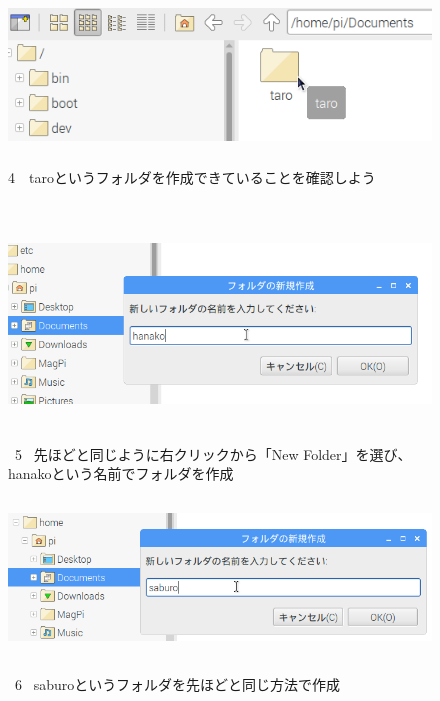 \documentclass[a4paper,12pt]{jarticle}
\begin{document}
\begin{figure}[ht]
  \centering
  \includegraphics[width=12.659cm,height=3.972cm]{textbook-img040.png}
  \begin{minipage}{\textwidth}
    4　taroというフォルダを作成できていることを確認しよう
  \end{minipage}

\end{figure}
\clearpage
\begin{figure}
  \\
  \vspace{10mm}
  \centering
  \includegraphics[width=14.289cm,height=5.431cm]{textbook-img041.png}
  \begin{minipage}{\textwidth}
    \ 5
    \ 先ほどと同じように右クリックから「New Folder」を選び、hanakoという名前でフォルダを作成
  \end{minipage}

  \centering
  \includegraphics[width=13.884cm,height=4.189cm]{textbook-img042.png}
  \begin{minipage}{\textwidth}
    \ 6
    \ saburoというフォルダを先ほどと同じ方法で作成
  \end{minipage}


\end{figure}
\end{document}
